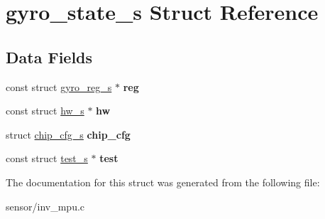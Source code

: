 \hypertarget{structgyro__state__s}{}\section{gyro\+\_\+state\+\_\+s Struct Reference}
\label{structgyro__state__s}
\subsection*{Data Fields}
\begin{DoxyCompactItemize}
\item 
const struct \hyperlink{structgyro__reg__s}{gyro\+\_\+reg\+\_\+s} $\ast$ {\bfseries reg}\hypertarget{structgyro__state__s_ab81a297ff88fa129df1073cbe8b13b60}{}\label{structgyro__state__s_ab81a297ff88fa129df1073cbe8b13b60}

\item 
const struct \hyperlink{structhw__s}{hw\+\_\+s} $\ast$ {\bfseries hw}\hypertarget{structgyro__state__s_a526c0d4f57dfc6b3357f145f6054a46f}{}\label{structgyro__state__s_a526c0d4f57dfc6b3357f145f6054a46f}

\item 
struct \hyperlink{structchip__cfg__s}{chip\+\_\+cfg\+\_\+s} {\bfseries chip\+\_\+cfg}\hypertarget{structgyro__state__s_ac895217592e2084bd520b0be8e9d20ee}{}\label{structgyro__state__s_ac895217592e2084bd520b0be8e9d20ee}

\item 
const struct \hyperlink{structtest__s}{test\+\_\+s} $\ast$ {\bfseries test}\hypertarget{structgyro__state__s_a6e1e81d8d019775b07ef4cc2b25a0759}{}\label{structgyro__state__s_a6e1e81d8d019775b07ef4cc2b25a0759}

\end{DoxyCompactItemize}


The documentation for this struct was generated from the following file\+:\begin{DoxyCompactItemize}
\item 
sensor/inv\+\_\+mpu.\+c\end{DoxyCompactItemize}
